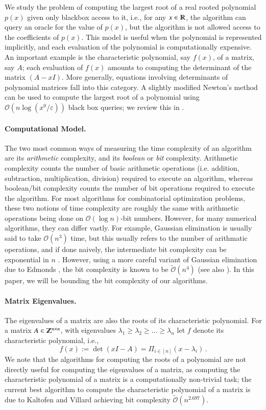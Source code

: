 \documentclass{article}[12pt]
\theoremstyle{definition}
\renewcommand{\mathbb}{\varmathbb}
\renewcommand{\geq}{\geqslant}
\newcommand{\mper}{\,.}
\newcommand{\paren}[1]{\left(#1 \right )}
\newcommand{\defeq}{\stackrel{\textup{def}}{=}}
\newcommand{\Z}{{\mathbb Z}}
\newcommand{\R}{\mathbb R}
\newcommand{\e}{\epsilon}
\let\e\varepsilon
\newcommand{\bigO}{\mathcal{O}}
\newcommand{\bigo}[1]{\bigO\left(#1\right)}
\newcommand{\tbigO}{\tilde{\mathcal{O}}}
\newcommand{\tbigo}[1]{\tbigO\left(#1\right)}
\renewcommand{\defeq}{:=}
\newcommand{\charp}{f}
\begin{document}
We study the problem of computing the largest root of a real rooted polynomial $p(x)$ given only 
blackbox access to it, i.e., for any $x \in \R$, the algorithm can query an oracle for the
value of $p(x)$, but the algorithm is not allowed access to the coefficients of $p(x)$. 
This model is useful when the polynomial is represented implicitly, and each evaluation
of the polynomial is computationally expensive. An important example is the characteristic polynomial,
say $\charp(x)$, of a matrix, say $A$; each evaluation of $\charp(x)$ amounts to computing
the determinant of the matrix $\paren{A - xI}$. More generally,   
equations involving determinants of polynomial matrices  fall into this category.
A slightly modified Newton's method can be used to compute the largest root of a polynomial 
using $\bigo{n \log (x^0/\e)}$ black box queries; we review this in .

\paragraph{Computational Model.}
The two most common ways of measuring the time complexity of an algorithm are its 
{\em arithmetic} complexity, and its {\em boolean} or {\em bit} complexity.
Arithmetic complexity counts the number of basic arithmetic operations (i.e. addition, subtraction,
multiplication, division) required to execute an algorithm, whereas boolean/bit complexity
counts the number of bit operations required to execute the algorithm.
For most algorithms for combinatorial optimization problems, these two notions of time complexity are 
roughly the same with arithmetic operations being done on $\bigo{\log n}$-bit numbers.
However, for many numerical algorithms, they can differ vastly.
For example, 
Gaussian elimination is usually said to take $\bigo{n^3}$ time, but this usually refers to the number of 
arithmatic operations, and if done naively, the intermediate bit complexity can be exponential in $n$
\cite{b66,f77}.
However, using a more careful variant of 
Gaussian elimination due to Edmonds \cite{e67}, the bit complexity is known to be $\tbigo{n^4}$ 
(see also \cite{bar68,dix82,s98}). 
In this paper, we will be bounding the bit complexity of our algorithms.  


\paragraph{Matrix Eigenvalues.}
The eigenvalues of a matrix are also the roots of its characteristic polynomial.
For a matrix $A \in \Z^{n \times n}$, with eigenvalues $\lambda_1 \geq \lambda_2 \geq  \ldots \geq \lambda_n$ let 
$\charp$ denote its characteristic polynomial, i.e.,
\[ \charp(x) \defeq \det \paren{x I - A } = \Pi_{i \in [n]} (x - \lambda_i) \mper \] 
We note that the algorithms for computing the roots of a polynomial are not directly useful 
for computing the eigenvalues of a matrix, as
computing the characteristic polynomial of a matrix is a computationally non-trivial task; 
the current best algorithm to compute the characteristic polynomial of a matrix 
is due to Kaltofen and Villard \cite{kv05b} achieving bit complexity $\tbigo{n^{2.697}}$. 
\end{document}
